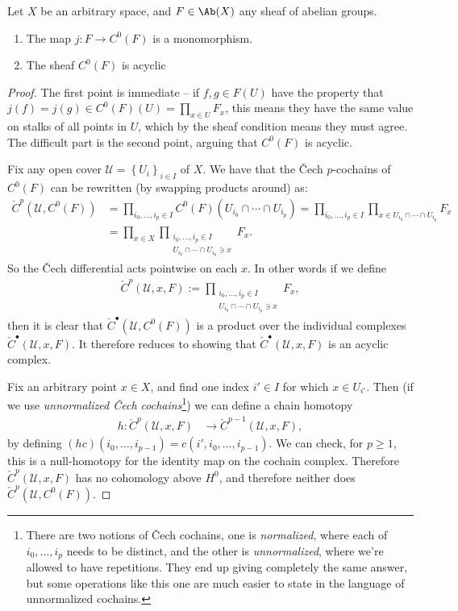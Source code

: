 \documentclass[11pt]{book}
\begin{document}
\begin{proposition}\label{prop:godement-sheaves-are-acyclic} 
Let $X$ be an arbitrary space, and $F\in \Ab(X)$ any sheaf of abelian groups.
\begin{enumerate}
    \item The map $j \colon F \to C^0(F)$ is a monomorphism.
    \item The sheaf $C^0(F)$ is acyclic
\end{enumerate}
\end{proposition}
\begin{proof} The first point is immediate -- if $f,g\in F(U)$ have the property that $j(f) = j(g) \in C^0(F)(U) = \prod_{x\in U}F_x$, this means they have the same value on stalks of all points in $U$, which by the sheaf condition means they must agree. The difficult part is the second point, arguing that $C^0(F)$ is acyclic.

Fix any open cover $\mathcal{U} = \left\{ U_i \right\}_{i\in I}$ of $X$. We have that the \v{C}ech $p$-cochains of $C^0(F)$ can be rewritten (by swapping products around) as:
\begin{align*}
    \check{C}^p(\mathcal{U},C^0(F)) &= \prod_{i_0, \ldots, i_p\in I} C^0(F)(U_{i_0} \cap \cdots \cap U_{i_p}) = \prod_{i_0, \ldots, i_p\in I}\prod_{x\in U_{i_0}\cap \cdots \cap U_{i_p}}F_x \\
    &= \prod_{x\in X} \prod_{\substack{i_0, \ldots, i_p\in I \\ U_{i_0}\cap \cdots \cap U_{i_p}\ni x}}F_x.
\end{align*}
So the \v{C}ech differential acts pointwise on each $x$. In other words if we define
\begin{align*}
    \check{C}^p(\mathcal{U},x,F) := \prod_{\substack{i_0, \ldots, i_p\in I \\ U_{i_0}\cap \cdots \cap U_{i_p}\ni x}}F_x,
\end{align*}
then it is clear that $\check{C}^\bullet(\mathcal{U},C^0(F))$ is a product over the individual complexes $\check{C}^\bullet(\mathcal{U},x,F)$. It therefore reduces to showing that $\check{C}^\bullet(\mathcal{U},x,F)$ is an acyclic complex.

Fix an arbitrary point $x\in X$, and find one index $i'\in I$ for which $x\in U_{i'}$. Then (if we use \emph{unnormalized \v{C}ech cochains}\footnote{There are two notions of \v{C}ech cochains, one is \emph{normalized}, where each of $i_0, \ldots, i_p$ needs to be distinct, and the other is \emph{unnormalized}, where we're allowed to have repetitions. They end up giving completely the same answer, but some operations like this one are much easier to state in the language of unnormalized cochains.}) we can define a chain homotopy
\begin{align*}
    h \colon \check{C}^p(\mathcal{U},x,F) &\to \check{C}^{p-1}(\mathcal{U},x,F),
\end{align*}
by defining $(hc)(i_0, \ldots, i_{p-1}) = c(i',i_0, \ldots, i_{p-1})$. We can check, for $p\ge1$, this is a null-homotopy for the identity map on the cochain complex. Therefore $\check{C}^p(\mathcal{U},x,F)$ has no cohomology above $H^0$, and therefore neither does $\check{C}^p(\mathcal{U},C^0(F))$.
\end{proof}
\end{document}
